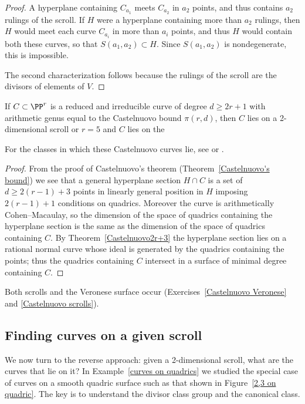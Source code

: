 \begin{proof}
A hyperplane containing $C_{a_1}$ meets $C_{a_2}$ in $a_2$
points, and thus contains $a_2$ rulings of the scroll. If $H$ were a
hyperplane containing more than $a_2$
rulings, then $H$ would meet each curve $C_{a_i}$ in more than $a_i$
points, and thus $H$ would contain
both these curves, so that $S(a_1,a_2)\subset H$. Since $S(a_1,a_2)$
is nondegenerate, this is impossible.

The second characterization follows because the rulings of the scroll
are the divisors of elements of $V.$
\end{proof}

\begin{theorem}\label{Castelnuovo examples}
If $C\subset \PP^r$ is a reduced and irreducible curve of degree $d\geq
2r+1$ with arithmetic genus equal to
the
%
%
Castelnuovo bound $\pi(r,d)$, then $C$ lies on a 2-dimensional scroll
or $r=5$ and $C$ lies on  the 
%
\unif
\end{theorem}

For the classes in which these Castelnuovo curves lie, see \cite[Theorem
3.11]{MR685427} or \cite[p.~533]{Griffiths-Harris1978}.
\unif

\begin{proof}
From the proof of Castelnuovo's theorem (Theorem~\ref{Castelnuovo's
bound}) we see that a general hyperplane
section $H\cap C$ is a set of $d\geq 2(r-1)+3$ points in linearly general
position in $H$ imposing $2(r-1)+1$ conditions on quadrics. Moreover
the curve
is arithmetically Cohen--Macaulay, so the dimension of the space of
quadrics containing the hyperplane section
is the same as the dimension of the space of quadrics containing $C$. By
Theorem~\ref{Castelnuovo2r+3} the hyperplane
section lies on a rational normal curve whose ideal is generated by the
quadrics containing the points;
thus the quadrics containing $C$ intersect in a surface of minimal degree
containing $C$.
\unif
\end{proof}

Both scrolls and the Veronese surface occur (Exercises~\ref{Castelnuovo
Veronese} and \ref{Castelnuovo scrolls}).

\subsection*{Finding curves on a given scroll}

We now turn to the reverse approach: given a 2-dimensional scroll,
what are the curves that lie on it?
In Example~\ref{curves on quadrics} we studied the special case of
curves on a smooth quadric surface such as that shown in 
Figure~\ref{2,3 on quadric}.
The key is to understand the divisor class group and the canonical class.

